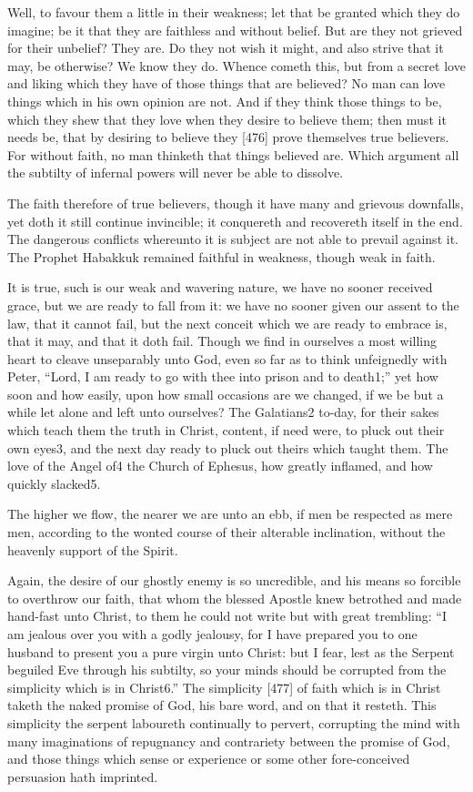 Well, to favour them a little in their weakness; let that be granted which they do imagine; be it that they are faithless and without belief. But are they not grieved for their unbelief? They are. Do they not wish it might, and also strive that it may, be otherwise? We know they do. Whence cometh this, but from a secret love and liking which they have of those things that are believed? No man can love things which in his own opinion are not. And if they think those things to be, which they shew that they love when they desire to believe them; then must it needs be, that by desiring to believe they [476] prove themselves true believers. For without faith, no man thinketh that things believed are. Which argument all the subtilty of infernal powers will never be able to dissolve.

The faith therefore of true believers, though it have many and grievous downfalls, yet doth it still continue invincible; it conquereth and recovereth itself in the end. The dangerous conflicts whereunto it is subject are not able to prevail against it. The Prophet Habakkuk remained faithful in weakness, though weak in faith.

It is true, such is our weak and wavering nature, we have no sooner received grace, but we are ready to fall from it: we have no sooner given our assent to the law, that it cannot fail, but the next conceit which we are ready to embrace is, that it may, and that it doth fail. Though we find in ourselves a most willing heart to cleave unseparably unto God, even so far as to think unfeignedly with Peter, “Lord, I am ready to go with thee into prison and to death1;” yet how soon and how easily, upon how small occasions are we changed, if we be but a while let alone and left unto ourselves? The Galatians2 to-day, for their sakes which teach them the truth in Christ, content, if need were, to pluck out their own eyes3, and the next day ready to pluck out theirs which taught them. The love of the Angel of4 the Church of Ephesus, how greatly inflamed, and how quickly slacked5.

The higher we flow, the nearer we are unto an ebb, if men be respected as mere men, according to the wonted course of their alterable inclination, without the heavenly support of the Spirit.

Again, the desire of our ghostly enemy is so uncredible, and his means so forcible to overthrow our faith, that whom the blessed Apostle knew betrothed and made hand-fast unto Christ, to them he could not write but with great trembling: “I am jealous over you with a godly jealousy, for I have prepared you to one husband to present you a pure virgin unto Christ: but I fear, lest as the Serpent beguiled Eve through his subtilty, so your minds should be corrupted from the simplicity which is in Christ6.” The simplicity [477] of faith which is in Christ taketh the naked promise of God, his bare word, and on that it resteth. This simplicity the serpent laboureth continually to pervert, corrupting the mind with many imaginations of repugnancy and contrariety between the promise of God, and those things which sense or experience or some other fore-conceived persuasion hath imprinted.

